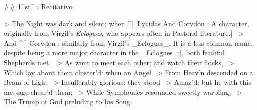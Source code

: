 ## 1^st^ \mvmt: Recitativo


> The Night was dark and silent; when ^[| Lycidas \< \newline And Corydon \> : A character, originally from Virgil's \textit{Eclogues}, who appears often in Pastoral literature.] \
> And ^[| Corydon : similarly from Virgil's _Eclogues_. It is a less common name, despite being a more major character in the _Eclogues_;], both faithful Shepherds met,  \
> As wont to meet each other; and watch their flocks,  \
> Which lay about them cluster’d: when an Angel  \
> From Heav’n descended on a Beam of Light  \
> Insufferably glorious: they stood  \
> Amaz’d: but he with this message chear’d them;  \
> While Symphonies resounded sweetly warbling,  \
> The Trump of God preluding to his Song.
